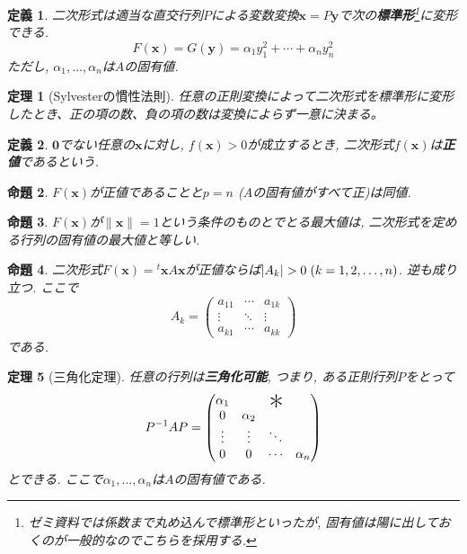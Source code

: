\documentclass[a4j,dvipdfmx]{jsarticle}
\newcommand{\trans}{{}^t}
\theoremstyle{mystyle}
\newtheorem*{definition}{定義}
\newtheorem{theorem}{定理}[section]
\newtheorem{proposition}[theorem]{命題}
\begin{document}
    \begin{definition}
        二次形式は適当な直交行列$P$による変数変換$\bm{x}=P\bm{y}$で次の\textbf{標準形}\footnote{ゼミ資料では係数まで丸め込んで標準形といったが, 固有値は陽に出しておくのが一般的なのでこちらを採用する.}に変形できる.
        \begin{equation*}
            F(\bm{x})=G(\bm{y})=\alpha_1y_1^2+\cdots+\alpha_n y_n^2
        \end{equation*}
        ただし, $\alpha_1,\dots,\alpha_n$は$A$の固有値.
    \end{definition}
    \begin{theorem}[Sylvesterの慣性法則]
        任意の正則変換によって二次形式を標準形に変形したとき、正の項の数、負の項の数は変換によらず一意に決まる。
    \end{theorem}
    \begin{definition}
        $\bm{0}$でない任意の$\bm{x}$に対し, $f(\bm{x})>0$が成立するとき, 二次形式$f(\bm{x})$は\textbf{正値}であるという.
    \end{definition}
    \begin{proposition}
        $F(\bm{x})$が正値であることと$p=n$ ($A$の固有値がすべて正)は同値.
    \end{proposition}
    \begin{proposition}
        $F(\bm{x})$が$\|\bm{x}\|=1$という条件のものとでとる最大値は, 二次形式を定める行列の固有値の最大値と等しい.
    \end{proposition}
    \begin{proposition}
        二次形式$F(\bm{x})=\trans\bm{x}A\bm{x}$が正値ならば$|A_k|>0\hspace{1mm}(k=1,2,\dots,n)$. 逆も成り立つ. ここで
        \begin{equation*}
            A_k=\begin{pmatrix}
                a_{11} & \cdots & a_{1k} \\
                \vdots & \ddots & \vdots\\
                a_{k1} & \cdots & a_{kk}
            \end{pmatrix}
        \end{equation*}
        である.
    \end{proposition}
    \begin{theorem}[三角化定理]
        任意の行列は\textbf{三角化可能}, つまり, ある正則行列$P$をとって
        \begin{equation*}
            P^{-1}AP = \begin{pmatrix}
                \alpha_1 & \multicolumn{3}{c}{\smash{\raisebox{-2.5ex}{\Huge *}}} \\
                0 & \alpha_2 & & \\
                \vdots & \vdots & \ddots & \\
                0 & 0 & \cdots & \alpha_n
            \end{pmatrix}
        \end{equation*}
        とできる. ここで$\alpha_1,\dots,\alpha_n$は$A$の固有値である.
    \end{theorem}
\end{document}

